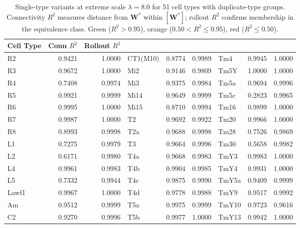 \documentclass[11pt,a4paper]{article}
\begin{document}
\begin{table}[h!]
\centering
\footnotesize
\begin{tabular}{lrr@{\quad}lrr@{\quad}lrr}
\toprule
Cell Type & Conn $R^2$ & Rollout $R^2$ & &  &  &  &  &  \\
\midrule
R2 & \cellcolor{corange} 0.9421 & 1.0000 & CT1(M10) & \cellcolor{corange} 0.8774 & 0.9989 & Tm4 & \cellcolor{cgreen} 0.9945 & 1.0000 \\
R3 & \cellcolor{cgreen} 0.9672 & 1.0000 & Mi2 & \cellcolor{corange} 0.9146 & 0.9809 & Tm5Y & \cellcolor{cgreen} 1.0000 & 1.0000 \\
R4 & \cellcolor{corange} 0.7408 & 0.9974 & Mi3 & \cellcolor{corange} 0.9375 & 0.9984 & Tm5a & \cellcolor{cgreen} 0.9694 & 0.9996 \\
R5 & \cellcolor{cgreen} 0.9921 & 0.9999 & Mi14 & \cellcolor{cgreen} 0.9649 & 0.9999 & Tm5c & \cellcolor{cred} 0.2823 & 0.9965 \\
R6 & \cellcolor{cgreen} 0.9995 & 1.0000 & Mi15 & \cellcolor{corange} 0.8710 & 0.9994 & Tm16 & \cellcolor{cgreen} 0.9899 & 1.0000 \\
R7 & \cellcolor{cgreen} 0.9987 & 1.0000 & T2 & \cellcolor{cgreen} 0.9692 & 0.9922 & Tm20 & \cellcolor{cgreen} 0.9966 & 1.0000 \\
R8 & \cellcolor{corange} 0.8993 & 0.9998 & T2a & \cellcolor{cgreen} 0.9688 & 0.9998 & Tm28 & \cellcolor{corange} 0.7526 & 0.9869 \\
L1 & \cellcolor{corange} 0.7275 & 0.9979 & T3 & \cellcolor{cgreen} 0.9664 & 0.9996 & Tm30 & \cellcolor{corange} 0.5658 & 0.9982 \\
L2 & \cellcolor{corange} 0.6171 & 0.9980 & T4a & \cellcolor{cgreen} 0.9668 & 0.9983 & TmY3 & \cellcolor{cgreen} 0.9983 & 1.0000 \\
L4 & \cellcolor{cgreen} 0.9961 & 0.9983 & T4b & \cellcolor{cgreen} 0.9904 & 0.9985 & TmY4 & \cellcolor{cgreen} 0.9931 & 1.0000 \\
L5 & \cellcolor{corange} 0.7332 & 0.9944 & T4c & \cellcolor{cgreen} 0.9875 & 0.9990 & TmY5a & \cellcolor{corange} 0.9409 & 0.9999 \\
Lawf1 & \cellcolor{cgreen} 0.9967 & 1.0000 & T4d & \cellcolor{cgreen} 0.9778 & 0.9988 & TmY9 & \cellcolor{cgreen} 0.9517 & 0.9992 \\
Am & \cellcolor{cgreen} 0.9512 & 0.9999 & T5a & \cellcolor{cgreen} 0.9975 & 0.9999 & TmY10 & \cellcolor{cgreen} 0.9723 & 0.9616 \\
C2 & \cellcolor{corange} 0.9270 & 0.9996 & T5b & \cellcolor{cgreen} 0.9977 & 1.0000 & TmY13 & \cellcolor{cgreen} 0.9942 & 1.0000 \\
\bottomrule
\end{tabular}
\caption{Single-type variants at extreme scale $\lambda=8.0$ for 51 cell types with
duplicate-type groups. Connectivity $R^2$ measures distance from $\mathbf{W}^*$
within $[\mathbf{W}^*]$; rollout $R^2$ confirms membership in the equivalence
class. Green ($R^2>0.95$), orange ($0.50<R^2\leq 0.95$), red ($R^2\leq 0.50$).}
\label{tab:lambda_8}
\end{table}
\end{document}

